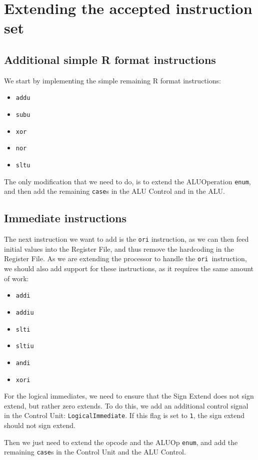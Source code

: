 \documentclass{beamer}
\begin{document}
\section{Extending the accepted instruction set}
\subsection{Additional simple R format instructions}
\begin{frame}
    We start by implementing the simple remaining R format instructions:
    \begin{itemize}
        \item \texttt{addu}
        \item \texttt{subu}
        \item \texttt{xor}
        \item \texttt{nor}
        \item \texttt{sltu}
    \end{itemize}
    The only modification that we need to do, is to extend the ALUOperation
    \texttt{enum}, and then add the remaining \texttt{case}s in the ALU Control
    and in the ALU.
\end{frame}

\subsection{Immediate instructions}
\begin{frame}
    The next instruction we want to add is the \texttt{ori} instruction, as we
    can then feed initial values into the Register File, and thus remove the
    hardcoding in the Register File. As we are extending the processor to
    handle the \texttt{ori} instruction, we should also add support for these
    instructions, as it requires the same amount of work:
    \begin{itemize}
        \item \texttt{addi}
        \item \texttt{addiu}
        \item \texttt{slti}
        \item \texttt{sltiu}
        \item \texttt{andi}
        \item \texttt{xori}
    \end{itemize}
\end{frame}
\begin{frame}
    For the logical immediates, we need to ensure that the Sign Extend does not
    sign extend, but rather zero extends. To do this, we add an additional
    control signal in the Control Unit: \texttt{LogicalImmediate}. If this flag
    is set to \texttt{1}, the sign extend should not sign extend.

    \vspace{\baselineskip}
    Then we just need to extend the opcode and the ALUOp \texttt{enum}, and add
    the remaining \texttt{case}s in the Control Unit and the ALU Control.
\end{frame}
\end{document}
